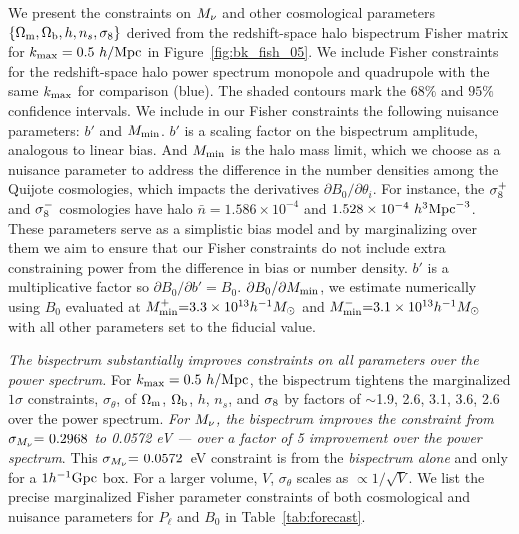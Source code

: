 We present the constraints on $M_\nu$ and other cosmological parameters 
$\{\Omega_{\rm m}, \Omega_{\rm b}, h, n_s, \sigma_8\}$ derived from the redshift-space halo bispectrum 
Fisher matrix for $k_{\rm max} = 0.5~h/{\rm Mpc}$ in Figure~\ref{fig:bk_fish_05}. 
We include Fisher constraints for the redshift-space halo power spectrum 
monopole and quadrupole with the same $k_{\rm max}$ for comparison (blue). 
The shaded contours mark the $68\%$ and $95\%$ confidence intervals. We include 
in our Fisher constraints the following nuisance parameters: $b'$ and $M_{\rm min}$. 
$b'$ is a scaling factor on the bispectrum amplitude, analogous to linear bias. 
And $M_{\rm min}$ is the halo mass limit, which we choose as a nuisance
parameter to address the difference in the number densities among the Quijote
cosmologies, which impacts the derivatives $\partial B_0/\partial \theta_i$. 
For instance, the $\sigma_8^{+}$ and $\sigma_8^{-}$ cosmologies have halo 
$\bar{n} = 1.586\times10^{-4}$ and $1.528 \times 10^{-4}~h^{3}{\rm Mpc}^{-3}$. 
These parameters serve as a simplistic bias model and by marginalizing 
over them we aim to ensure that our Fisher constraints do not include extra 
constraining power from the difference in bias or number density. $b'$ is a 
multiplicative factor so $\partial B_0/\partial b' = B_0$. 
$\partial B_0/\partial M_{\rm min}$, we estimate numerically using 
$B_0$ evaluated at $M^{+}_{\rm min}{=}3.3\times10^{13}h^{-1}M_\odot$ 
and $M^{-}_{\rm min}{=}3.1\times10^{13}h^{-1}M_\odot$ with all other parameters 
set to the fiducial value. 

{\em The bispectrum substantially improves constraints on all parameters 
over the power spectrum.} For $k_{\rm max} = 0.5~h/{\rm Mpc}$, the 
bispectrum tightens the marginalized $1\sigma$ constraints, $\sigma_\theta$, of $\Omega_{\rm m}$, 
$\Omega_{\rm b}$, $h$, $n_s$, and $\sigma_8$ by factors of $\sim$1.9, 2.6, 3.1, 3.6, 2.6 over 
the power spectrum. {\em For $M_\nu$, the bispectrum improves the constraint 
from $\sigma_{M_\nu}{=}~0.2968$ to 0.0572 eV --- over a factor of 5 improvement 
over the power spectrum}. This $\sigma_{M_\nu}{=}~0.0572$~eV constraint is from 
the {\em bispectrum alone} and only for a $1h^{-1}{\rm Gpc}$ box. For a larger 
volume, $V$, $\sigma_\theta$ scales as $\propto1/\sqrt{V}$. We list the precise
marginalized Fisher parameter constraints of both cosmological and nuisance 
parameters for $P_\ell$ and $B_0$ in Table~\ref{tab:forecast}. 

